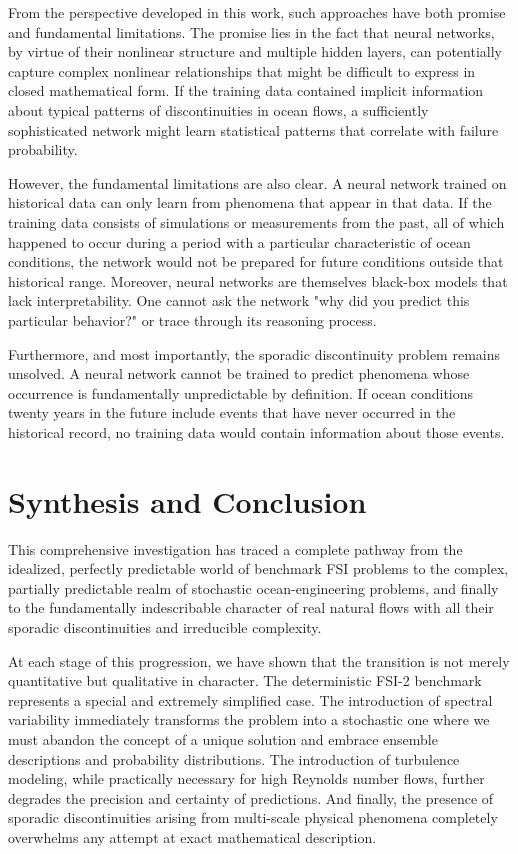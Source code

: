 ﻿\documentclass[a4paper,11pt]{article}
\theoremstyle{definition}
\begin{document}
From the perspective developed in this work, such approaches have both promise and fundamental limitations. The promise lies in the fact that neural networks, by virtue of their nonlinear structure and multiple hidden layers, can potentially capture complex nonlinear relationships that might be difficult to express in closed mathematical form. If the training data contained implicit information about typical patterns of discontinuities in ocean flows, a sufficiently sophisticated network might learn statistical patterns that correlate with failure probability.

However, the fundamental limitations are also clear. A neural network trained on historical data can only learn from phenomena that appear in that data. If the training data consists of simulations or measurements from the past, all of which happened to occur during a period with a particular characteristic of ocean conditions, the network would not be prepared for future conditions outside that historical range. Moreover, neural networks are themselves black-box models that lack interpretability. One cannot ask the network "why did you predict this particular behavior?" or trace through its reasoning process.

Furthermore, and most importantly, the sporadic discontinuity problem remains unsolved. A neural network cannot be trained to predict phenomena whose occurrence is fundamentally unpredictable by definition. If ocean conditions twenty years in the future include events that have never occurred in the historical record, no training data would contain information about those events.

\section{Synthesis and Conclusion}

This comprehensive investigation has traced a complete pathway from the idealized, perfectly predictable world of benchmark FSI problems to the complex, partially predictable realm of stochastic ocean-engineering problems, and finally to the fundamentally indescribable character of real natural flows with all their sporadic discontinuities and irreducible complexity.

At each stage of this progression, we have shown that the transition is not merely quantitative but qualitative in character. The deterministic FSI-2 benchmark represents a special and extremely simplified case. The introduction of spectral variability immediately transforms the problem into a stochastic one where we must abandon the concept of a unique solution and embrace ensemble descriptions and probability distributions. The introduction of turbulence modeling, while practically necessary for high Reynolds number flows, further degrades the precision and certainty of predictions. And finally, the presence of sporadic discontinuities arising from multi-scale physical phenomena completely overwhelms any attempt at exact mathematical description.
\end{document}
